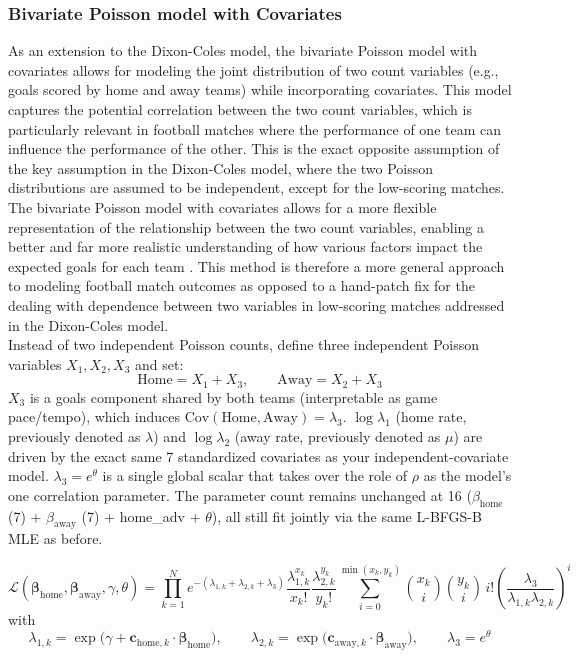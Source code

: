 \documentclass{article}
\begin{document}
\subsubsection{Bivariate Poisson model with Covariates}
\label{sec:bivariate-poisson}
As an extension to the Dixon-Coles model, the bivariate Poisson model with covariates allows for modeling the joint distribution of two count variables (e.g., goals scored by home and away teams) while incorporating covariates. This model captures the potential correlation between the two count variables, which is particularly relevant in football matches where the performance of one team can influence the performance of the other. This is the exact opposite assumption of the key assumption in the Dixon-Coles model, where the two Poisson distributions are assumed to be independent, except for the low-scoring matches. The bivariate Poisson model with covariates allows for a more flexible representation of the relationship between the two count variables, enabling a better and far more realistic understanding of how various factors impact the expected goals for each team \cite{KarlisNtzoufras2003}. This method is therefore a more general approach to modeling football match outcomes as opposed to a hand-patch fix for the dealing with dependence between two variables in low-scoring matches addressed in the Dixon-Coles model. 
\\
Instead of two independent Poisson counts, define three independent Poisson variables $X_1, X_2, X_3$ and set: $$\text{Home} = X_1 + X_3, \qquad \text{Away} = X_2 + X_3$$ $X_3$ is a goals component shared by both teams (interpretable as game pace/tempo), which induces $\mathrm{Cov}(\text{Home}, \text{Away}) = \lambda_3$. $\log\lambda_1$ (home rate, previously denoted as $\lambda$) and $\log\lambda_2$ (away rate, previously denoted as $\mu$) are driven by the exact same 7 standardized covariates as your independent-covariate model. $\lambda_3 = e^\theta$ is a single global scalar that takes over the role of $\rho$ as the model's one correlation parameter. The parameter count remains unchanged at 16 ($\beta_{\text{home}}$ (7) + $\beta_{\text{away}}$ (7) + home\_adv + $\theta$), all still fit jointly via the same L-BFGS-B MLE as before.

\begin{equation}
\mathcal{L}(\boldsymbol{\beta}_{\text{home}}, \boldsymbol{\beta}_{\text{away}}, \gamma, \theta) = \prod_{k=1}^{N} e^{-(\lambda_{1,k}+\lambda_{2,k}+\lambda_3)} \frac{\lambda_{1,k}^{x_k}}{x_k!} \frac{\lambda_{2,k}^{y_k}}{y_k!} \sum_{i=0}^{\min(x_k,y_k)} \binom{x_k}{i}\binom{y_k}{i}\, i! \left(\frac{\lambda_3}{\lambda_{1,k}\lambda_{2,k}}\right)^{i}
\end{equation}
with
\begin{equation}
\lambda_{1,k} = \exp\!\big(\gamma + \mathbf{c}_{\text{home},k} \cdot \boldsymbol{\beta}_{\text{home}}\big), \qquad \lambda_{2,k} = \exp\!\big(\mathbf{c}_{\text{away},k} \cdot \boldsymbol{\beta}_{\text{away}}\big), \qquad \lambda_3 = e^{\theta}
\end{equation}
\end{document}
